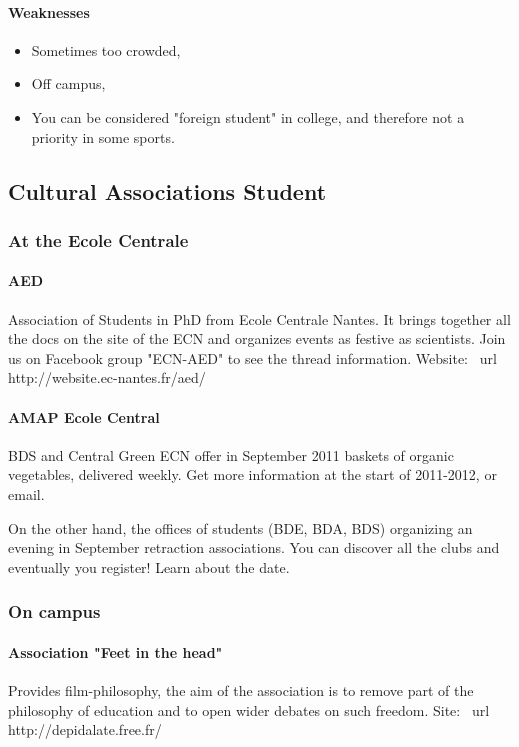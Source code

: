 \paragraph{Weaknesses}
\begin{itemize}
  \item Sometimes too crowded,
  \item Off campus,
  \item You can be considered "foreign student" in college, and therefore not a priority in some sports.
\end{itemize}

\subsection {Cultural Associations Student}
\subsubsection {At the Ecole Centrale}
\paragraph{AED} Association of Students in PhD from Ecole Centrale Nantes. It brings together all the docs on the site of the ECN and organizes events as festive as scientists. Join us on Facebook group "ECN-AED" to see the thread information. Website: \ url {} http://website.ec-nantes.fr/aed/
\paragraph{AMAP Ecole Central} BDS and Central Green ECN offer in September 2011 baskets of organic vegetables, delivered weekly. Get more information at the start of 2011-2012, or email.

On the other hand, the offices of students (BDE, BDA, BDS) organizing an evening in September retraction associations. You can discover all the clubs and eventually you register! Learn about the date.

\subsubsection{On campus}
\paragraph{Association "Feet in the head"} Provides film-philosophy, the aim of the association is to remove part of the philosophy of education and to open wider debates on such freedom. Site: \ url {} http://depidalate.free.fr/
